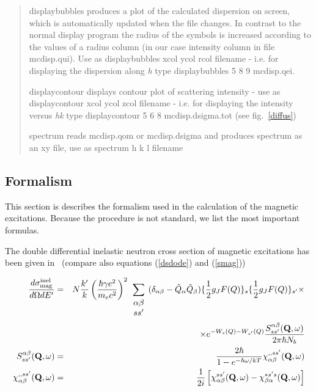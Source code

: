 \begin{quote}
\item [\prg displaybubbles\index{displaybubbles} ] produces a plot of the calculated dispersion on screen, which is 
                       automatically updated when the file changes. In contrast to the normal
		       display program the radius of the symbols is increased according to
		       the values of a radius column (in our case intensity column in file
		       mcdisp.qui). Use as {\prg displaybubbles 
		       xcol ycol rcol filename} - i.e. for displaying the dispersion along
		       {\em h} type {\prg displaybubbles  5 8 9 mcdisp.qei}. 
\item [\prg displaycontour\index{displaycontour}] displays contour plot of scattering intensity - use as
                       {\prg displaycontour xcol ycol zcol filename} - i.e. for displaying
		       the intensity versus {\em hk} type {\prg displaycontour 5 6 8 mcdisp.dsigma.tot}
		       (see fig.~\ref{diffus})
\item [\prg spectrum]  reads mcdisp.qom or mcdisp.dsigma and produces spectrum
                       as an xy file, use as {\prg spectrum h k l filename}
\end{quote}

\subsection{Formalism}
\label{formalism}

This section is describes the formalism used in the calculation of the magnetic excitations. Because the
procedure is not standard, we list the most important formulas.

The double differential
inelastic neutron cross section of magnetic excitations has been given in~\cite{jensen91-1}
 (compare also equations (\ref{dsdode}) and (\ref{smag}))

\begin{eqnarray}\label{int}
\frac{d \sigma_{\rm mag}^{\rm inel}}{d\Omega dE'}&=&N \frac{k'}{k} \left(\frac{\hbar \gamma e^2}{m_e c^2}\right)^2
\sum_{\begin{array}{c} \alpha \beta \\ s s' \\ \end{array}}
(\delta_{\alpha\beta}-\hat Q_{\alpha} \hat Q_{\beta})
\{\frac{1}{2} g_J F(Q)\}_s \{\frac{1}{2} g_J F(Q)\}_{s'}
 \times \nonumber  \\
&&\times e^{-W_s(Q)- W_{s'}(Q)} 
\frac{S_{ss'}^{\alpha\beta}({\mathbf Q},\omega)}{2\pi \hbar N_b}  \nonumber \\
S_{ss'}^{\alpha\beta}({\mathbf Q},\omega) &=&
\frac{2 \hbar}{1-e^{-\hbar\omega/kT}} \chi_{\alpha\beta}^{,,ss'}({\mathbf Q},\omega) \\ \nonumber
\chi_{\alpha\beta}^{,,ss'}({\mathbf Q},\omega)&=&
\frac{1}{2i}\left[
\chi_{\alpha\beta}^{ss'}({\mathbf Q},\omega)-
\chi_{\beta\alpha}^{*s's}({\mathbf Q},\omega)
\right]
\end{eqnarray}

